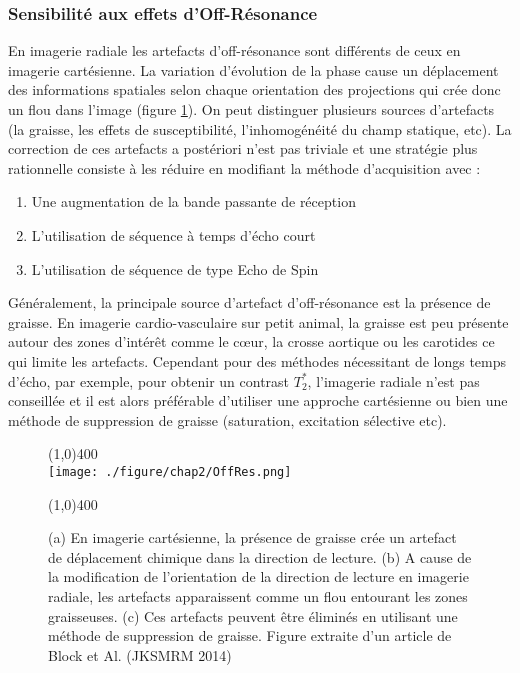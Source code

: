 \subsubsection{Sensibilité aux effets d'Off-Résonance}

En imagerie radiale les artefacts d'off-résonance sont différents de ceux en imagerie cartésienne. La variation d'évolution de la phase cause un déplacement des informations spatiales selon chaque orientation des projections qui crée donc un flou dans l'image (figure \ref{fig:OffRes}).
On peut distinguer plusieurs sources d'artefacts (la graisse, les effets de susceptibilité, l'inhomogénéité du champ statique, etc). La correction de ces artefacts a postériori n'est pas triviale et une stratégie plus rationnelle consiste à les réduire en modifiant la méthode d'acquisition avec :
\begin{enumerate}
\item Une augmentation de la bande passante de réception
\item L'utilisation de séquence à temps d'écho court
\item L'utilisation de séquence de type Echo de Spin
\end{enumerate}

Généralement, la principale source d'artefact d'off-résonance est la présence de graisse. En imagerie cardio-vasculaire sur petit animal, la graisse est peu présente autour des zones d'intérêt comme le cœur, la crosse aortique ou les carotides ce qui limite les artefacts. Cependant pour des méthodes nécessitant de longs temps d'écho, par exemple, pour obtenir un contrast $T_2^*$, l'imagerie radiale n'est pas conseillée et il est alors préférable d'utiliser une approche cartésienne ou bien une méthode de suppression de graisse (saturation, excitation sélective etc).
\begin{figure}[H]
\centering
\line(1,0){400} \\
\texttt{[image: ./figure/chap2/OffRes.png]}
\caption[artefact d'Off-résonance]{\label{fig:OffRes}  
(a) En imagerie cartésienne, la présence de graisse crée un artefact de déplacement chimique dans la direction de lecture. (b) A cause de la modification de l'orientation de la direction de lecture en imagerie radiale, les artefacts apparaissent comme un flou entourant les zones graisseuses. (c) Ces artefacts peuvent être éliminés en utilisant une méthode de suppression de graisse. Figure extraite d'un article de Block et Al. (JKSMRM 2014)}
\line(1,0){400} \\
\end{figure}


